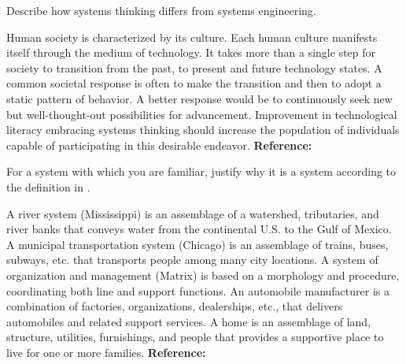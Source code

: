 \begin{exercises}
    \begin{exercise}
    \label{sea-01-26}
        Describe how systems thinking differs from systems engineering.
    \end{exercise}
    \begin{solution}
        Human society is characterized by its culture. Each human culture manifests itself through the medium of technology. It takes more than a single step for society to transition from the past, to present and future technology states. A common societal response is often to make the transition and then to adopt a static pattern of behavior. A better response would be to continuously seek new but well-thought-out possibilities for advancement. Improvement in technological literacy embracing systems thinking should increase the population of individuals capable of participating in this desirable endeavor. \textbf{Reference:}
    \end{solution}
    
    \begin{exercise}
    \label{sea-01-01}
        For a system with which you are familiar, justify why it is a system according to the definition in .
    \end{exercise}
    \begin{solution}
        A river system (Mississippi) is an assemblage of a watershed, tributaries, and river banks that conveys water from the continental U.S. to the Gulf of Mexico. A municipal transportation system (Chicago) is an assemblage of trains, buses, subways, etc. that transports people among many city locations. A system of organization and management (Matrix) is based on a morphology and procedure, coordinating both line and support functions. An automobile manufacturer is a combination of factories, organizations, dealerships, etc., that delivers automobiles and related support services. A home is an assemblage of land, structure, utilities, furnishings, and people that provides a supportive place to live for one or more families. \textbf{Reference:}
    \end{solution}
    

\end{exercises}
